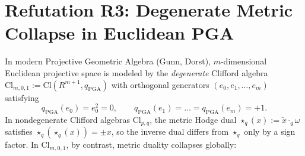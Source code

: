 \documentclass[11pt]{article}
\theoremstyle{definition}
\newcommand{\Cl}{\mathrm{Cl}}
\begin{document}
\section{Refutation R3: Degenerate Metric Collapse in Euclidean PGA}\label{sec:r3}

In modern Projective Geometric Algebra (Gunn, Dorst), $m$-dimensional Euclidean projective space is modeled by the \emph{degenerate} Clifford algebra $\Cl_{m,0,1} := \Cl(R^{m+1}, q_{\mathrm{PGA}})$ with orthogonal generators $(e_0, e_1, \dots, e_m)$ satisfying
\[
  q_{\mathrm{PGA}}(e_0) = e_0^2 = 0, \qquad q_{\mathrm{PGA}}(e_1) = \dots = q_{\mathrm{PGA}}(e_m) = +1.
\]
In nondegenerate Clifford algebras $\Cl_{p,q}$, the metric Hodge dual $\star_q(x) := \widetilde{x}\cdot_q \omega$ satisfies $\star_q(\star_q(x)) = \pm x$, so the inverse dual differs from $\star_q$ only by a sign factor. In $\Cl_{m,0,1}$, by contrast, metric duality collapses globally:
\end{document}
